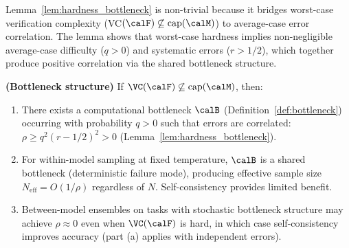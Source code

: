 \begin{remark}
Lemma~\ref{lem:hardness_bottleneck} is non-trivial because it bridges worst-case verification complexity (VC$(\calF) \not\subseteq \mathrm{cap}(\calM)$) to average-case error correlation. The lemma shows that worst-case hardness implies non-negligible average-case difficulty ($q > 0$) and systematic errors ($r > 1/2$), which together produce positive correlation via the shared bottleneck structure.
\end{remark}



\item \textbf{(Bottleneck structure)} If $\VC(\calF) \not\subseteq \mathrm{cap}(\calM)$, then:
\begin{enumerate}[label=(\roman*)]
    \item There exists a computational bottleneck $\calB$ (Definition~\ref{def:bottleneck}) occurring with probability $q > 0$ such that errors are correlated: $\rho \geq q^2(r - 1/2)^2 > 0$ (Lemma~\ref{lem:hardness_bottleneck}).

    \item For within-model sampling at fixed temperature, $\calB$ is a shared bottleneck (deterministic failure mode), producing effective sample size $N_{\text{eff}} = O(1/\rho)$ regardless of $N$. Self-consistency provides limited benefit.

    \item Between-model ensembles on tasks with stochastic bottleneck structure may achieve $\rho \approx 0$ even when $\VC(\calF)$ is hard, in which case self-consistency improves accuracy (part (a) applies with independent errors).
\end{enumerate}

